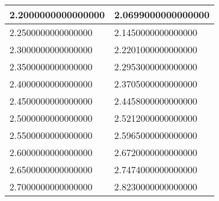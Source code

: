 \documentclass[a4paper,14pt]{article}
\begin{document}
\begin{longtable}{|l|l|}
2.2000000000000000	&	2.0699000000000000\\ \hline
2.2500000000000000	&	2.1450000000000000\\ \hline
2.3000000000000000	&	2.2201000000000000\\ \hline
2.3500000000000000	&	2.2953000000000000\\ \hline
2.4000000000000000	&	2.3705000000000000\\ \hline
2.4500000000000000	&	2.4458000000000000\\ \hline
2.5000000000000000	&	2.5212000000000000\\ \hline
2.5500000000000000	&	2.5965000000000000\\ \hline
2.6000000000000000	&	2.6720000000000000\\ \hline
2.6500000000000000	&	2.7474000000000000\\ \hline
2.7000000000000000	&	2.8230000000000000\\ \hline

\end{longtable}
\end{document}
